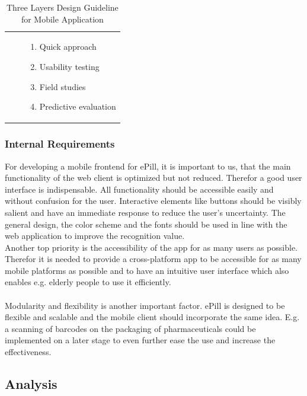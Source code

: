 \begin{table}[!htb]
\begin{tabular}{c | c | p{23.5em}}
        \cline{3-3}
        & & 
            \begin{enumerate}
                \item Quick approach
                \item Usability testing
                \item Field studies
                \item Predictive evaluation
            \end{enumerate}
        \\
    \end{tabular}
    \caption[Three Layers Design Guideline for Mobile Application]{Three Layers Design Guideline for Mobile Application\footnotemark}
    \label{tab:ThreeLayersDesignGuideline}
\end{table}

\subsubsection{Internal Requirements}
For developing a mobile frontend for ePill, it is important to us, that the main functionality of the web client is optimized but not reduced. Therefor a good user interface is indispensable. All functionality should be accessible easily and without confusion for the user. Interactive elements like buttons should be visibly salient and have an immediate response to reduce the user's uncertainty. The general design, the color scheme and the fonts should be used in line with the web application to improve the recognition value. 
\\
Another top priority is the accessibility of the app for as many users as possible. Therefor it is needed to provide a cross-platform app to be accessible for as many mobile platforms as possible and to have an intuitive user interface which also enables e.g. elderly people to use it efficiently.
\\
\\
Modularity and flexibility is another important factor. ePill is designed to be flexible and scalable and the mobile client should incorporate the same idea. E.g. a scanning of barcodes on the packaging of pharmaceuticals could be implemented on a later stage to even further ease the use and increase the effectiveness.
\subsection{Analysis}
\label{subsec:Analysis}
